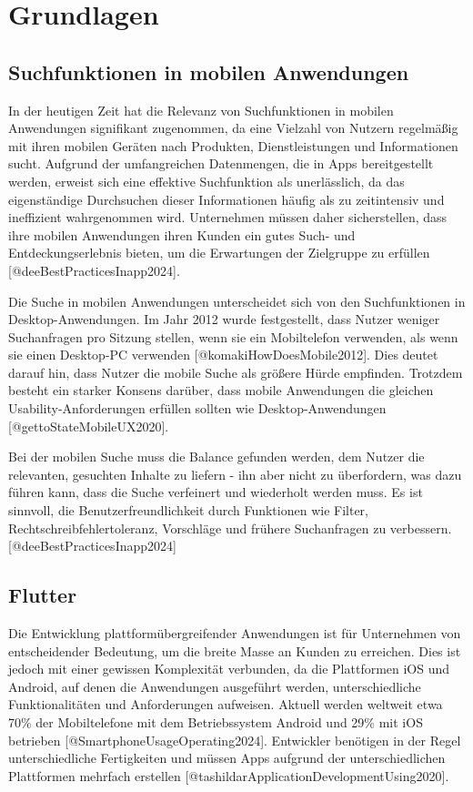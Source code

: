 \documentclass[
  12pt,
  a4paperpaper,
]{report}
\begin{document}
\chapter{Grundlagen}\label{grundlagen}

\section{Suchfunktionen in mobilen
Anwendungen}\label{suchfunktionen-in-mobilen-anwendungen}

In der heutigen Zeit hat die Relevanz von Suchfunktionen in mobilen
Anwendungen signifikant zugenommen, da eine Vielzahl von Nutzern
regelmäßig mit ihren mobilen Geräten nach Produkten, Dienstleistungen
und Informationen sucht. Aufgrund der umfangreichen Datenmengen, die in
Apps bereitgestellt werden, erweist sich eine effektive Suchfunktion als
unerlässlich, da das eigenständige Durchsuchen dieser Informationen
häufig als zu zeitintensiv und ineffizient wahrgenommen wird.
Unternehmen müssen daher sicherstellen, dass ihre mobilen Anwendungen
ihren Kunden ein gutes Such- und Entdeckungserlebnis bieten, um die
Erwartungen der Zielgruppe zu erfüllen {[}@deeBestPracticesInapp2024{]}.

Die Suche in mobilen Anwendungen unterscheidet sich von den
Suchfunktionen in Desktop-Anwendungen. Im Jahr 2012 wurde festgestellt,
dass Nutzer weniger Suchanfragen pro Sitzung stellen, wenn sie ein
Mobiltelefon verwenden, als wenn sie einen Desktop-PC verwenden
{[}@komakiHowDoesMobile2012{]}. Dies deutet darauf hin, dass Nutzer die
mobile Suche als größere Hürde empfinden. Trotzdem besteht ein starker
Konsens darüber, dass mobile Anwendungen die gleichen
Usability-Anforderungen erfüllen sollten wie Desktop-Anwendungen
{[}@gettoStateMobileUX2020{]}.

Bei der mobilen Suche muss die Balance gefunden werden, dem Nutzer die
relevanten, gesuchten Inhalte zu liefern - ihn aber nicht zu
überfordern, was dazu führen kann, dass die Suche verfeinert und
wiederholt werden muss. Es ist sinnvoll, die Benutzerfreundlichkeit
durch Funktionen wie Filter, Rechtschreibfehlertoleranz, Vorschläge und
frühere Suchanfragen zu verbessern. {[}@deeBestPracticesInapp2024{]}

\section{Flutter}\label{flutter}

Die Entwicklung plattformübergreifender Anwendungen ist für Unternehmen
von entscheidender Bedeutung, um die breite Masse an Kunden zu
erreichen. Dies ist jedoch mit einer gewissen Komplexität verbunden, da
die Plattformen iOS und Android, auf denen die Anwendungen ausgeführt
werden, unterschiedliche Funktionalitäten und Anforderungen aufweisen.
Aktuell werden weltweit etwa 70\thinspace\% der Mobiltelefone mit dem
Betriebssystem Android und 29\thinspace\% mit iOS betrieben
{[}@SmartphoneUsageOperating2024{]}. Entwickler benötigen in der Regel
unterschiedliche Fertigkeiten und müssen Apps aufgrund der
unterschiedlichen Plattformen mehrfach erstellen
{[}@tashildarApplicationDevelopmentUsing2020{]}.
\end{document}
